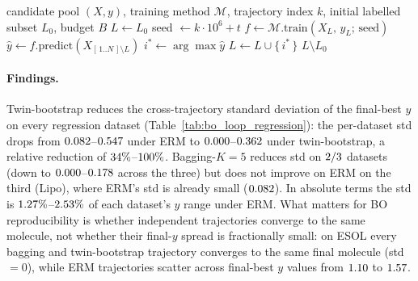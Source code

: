 \begin{algorithm}[H]
  \caption{BO trajectory (one trajectory of one method on one dataset).}
  \label{alg:bo-trajectory}
  \begin{algorithmic}[1]
    \Require candidate pool $(X, y)$, training method $\mathcal{M}$,
             trajectory index $k$, initial labelled subset $L_0$, budget $B$
    \State $L \gets L_0$
      \State seed $\gets k \cdot 10^6 + t$
      \State $f \gets \mathcal{M}.\text{train}(X_L,\, y_L;\,\text{seed})$
      \State $\hat{y} \gets f.\text{predict}(X_{[\,1..N\,]\setminus L})$
      \State $i^* \gets \arg\max \hat{y}$
      \State $L \gets L \cup \{\,i^*\,\}$
    \EndFor
    \State \Return $L \setminus L_0$
  \end{algorithmic}
\end{algorithm}



\paragraph{Findings.}
Twin-bootstrap reduces the cross-trajectory standard deviation of
the final-best $y$ on every regression dataset
(Table~\ref{tab:bo_loop_regression}): the per-dataset std drops
from $0.082$--$0.547$ under ERM to
$0.000$--$0.362$ under
twin-bootstrap, a relative reduction of
$34\%$--$100\%$.
Bagging-$K{=}5$ reduces std on
$2/3$ datasets (down to
$0.000$--$0.178$ across the three) but
does not improve on ERM on the third (Lipo), where ERM's std is
already small ($0.082$).  In absolute terms the std is
$1.27\%$--$2.53\%$
of each dataset's $y$ range under ERM.  What matters for BO
reproducibility is whether independent trajectories converge to the
same molecule, not whether their final-$y$ spread is fractionally
small: on ESOL every bagging and twin-bootstrap trajectory
converges to the same final molecule (std $= 0$), while ERM
trajectories scatter across final-best $y$ values from
$1.10$ to $1.57$.

